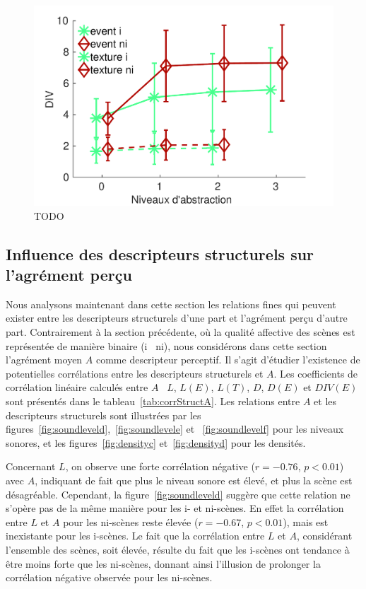 \begin{figure}[t]
        \myfloatalign
        \includegraphics[width=.9\linewidth]{gfxXpUrbanSoundscape/xp1_div_1}
       \caption[TODO]{TODO}\label{fig:diversity}
\end{figure}

\subsection{Influence des descripteurs structurels sur l'agrément perçu}
\label{sec:ch5_corrDesStruct}

Nous analysons maintenant dans cette section les relations fines qui peuvent exister entre les descripteurs structurels d'une part et l'agrément perçu d'autre part. Contrairement à la section précédente, où la qualité affective des scènes est représentée de manière binaire (i \vs~ni), nous considérons dans cette section l'agrément moyen $A$ comme descripteur perceptif. Il s'agit d'étudier l'existence de potentielles corrélations entre les descripteurs structurels et $A$. Les coefficients de corrélation linéaire calculés entre $A$ \vs~$L$, $L(E)$, $L(T)$, $D$, $D(E)$ et $DIV(E)$ sont présentés dans le tableau~\ref{tab:corrStructA}. Les relations entre $A$ et les descripteurs structurels sont illustrées par les figures~\ref{fig:soundleveld},~\ref{fig:soundlevele} et ~\ref{fig:soundlevelf} pour les niveaux sonores, et les figures~\ref{fig:densityc} et~\ref{fig:densityd} pour les densités. 

Concernant $L$, on observe une forte corrélation négative ($r=-0.76$, $p<0.01$) avec $A$, indiquant de fait que plus le niveau sonore est élevé, et plus la scène est désagréable. Cependant, la figure~\ref{fig:soundleveld} suggère que cette relation ne s'opère pas de la même manière pour les i- et ni-scènes. En effet la corrélation  entre $L$ et $A$ pour les ni-scènes reste élevée ($r=-0.67$, $p<0.01$), mais est inexistante pour les i-scènes. Le fait que la corrélation entre $L$ et $A$, considérant l'ensemble des scènes, soit élevée,  résulte du fait que les i-scènes ont tendance à être moins forte que les ni-scènes, donnant ainsi l'illusion de prolonger la corrélation négative observée pour les ni-scènes.  

